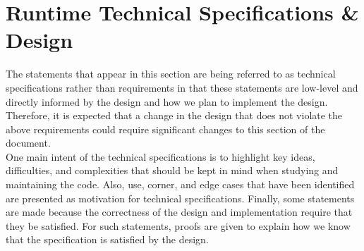 \documentclass{article}
\begin{document}
\section{Runtime Technical Specifications \& Design}
The statements that appear in this section are being referred to as technical
specifications rather than requirements in that these statements are low-level
and directly informed by the design and how we plan to implement the design.
Therefore, it is expected that a change in the design that does not violate the
above requirements could require significant changes to this section of the
document.\\

One main intent of the technical specifications is to highlight key ideas,
difficulties, and complexities that should be kept in mind when studying and
maintaining the code.  Also, use, corner, and edge cases that have been
identified are presented as motivation for technical specifications.  Finally,
some statements are made because the correctness of the design and
implementation require that they be satisfied.  For such statements, proofs are
given to explain how we know that the specification is satisfied by the design.

\end{document}

